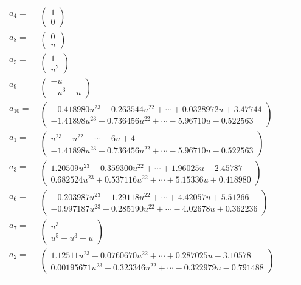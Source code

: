 \documentclass[1p]{elsarticle_modified}
\theoremstyle{definition}
\begin{document}
\begin{tabular}{m{7pt} m{180pt} m{7pt} m{180pt} }
\flushright $a_{4}=$&$\begin{pmatrix}1\\0\end{pmatrix}$ \\
\flushright $a_{8}=$&$\begin{pmatrix}0\\u\end{pmatrix}$ \\
\flushright $a_{5}=$&$\begin{pmatrix}1\\u^2\end{pmatrix}$ \\
\flushright $a_{9}=$&$\begin{pmatrix}- u\\- u^3+u\end{pmatrix}$ \\
\flushright $a_{10}=$&$\begin{pmatrix}-0.418980 u^{23}+0.263544 u^{22}+\cdots+0.0328972 u+3.47744\\-1.41898 u^{23}-0.736456 u^{22}+\cdots-5.96710 u-0.522563\end{pmatrix}$ \\
\flushright $a_{1}=$&$\begin{pmatrix}u^{23}+u^{22}+\cdots+6 u+4\\-1.41898 u^{23}-0.736456 u^{22}+\cdots-5.96710 u-0.522563\end{pmatrix}$ \\
\flushright $a_{3}=$&$\begin{pmatrix}1.20509 u^{23}-0.359300 u^{22}+\cdots+1.96025 u-2.45787\\0.682524 u^{23}+0.537116 u^{22}+\cdots+5.15336 u+0.418980\end{pmatrix}$ \\
\flushright $a_{6}=$&$\begin{pmatrix}-0.203987 u^{23}+1.29118 u^{22}+\cdots+4.42057 u+5.51266\\-0.997187 u^{23}-0.285190 u^{22}+\cdots-4.02678 u+0.362236\end{pmatrix}$ \\
\flushright $a_{7}=$&$\begin{pmatrix}u^3\\u^5- u^3+u\end{pmatrix}$ \\
\flushright $a_{2}=$&$\begin{pmatrix}1.12511 u^{23}-0.0760670 u^{22}+\cdots+0.287025 u-3.10578\\0.00195671 u^{23}+0.323346 u^{22}+\cdots-0.322979 u-0.791488\end{pmatrix}$\\&\end{tabular}
\end{document}
